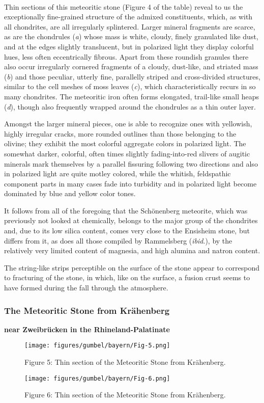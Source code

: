 \documentclass[a4paper, 12pt, oneside]{article}
\begin{document}
\paragraph*{}
Thin sections of this meteoritic stone (Figure 4 of the table) reveal to us the exceptionally fine-grained structure of the admixed constituents, which, as with all chondrites, are all irregularly splintered. Larger mineral fragments are scarce, as are the chondrules (\emph{a}) whose mass is white, cloudy, finely granulated like dust, and at the edges slightly translucent, but in polarized light they display colorful hues, less often eccentrically fibrous. Apart from these roundish granules there also occur irregularly cornered fragments of a cloudy, dust-like, and striated mass (\emph{b}) and those peculiar, utterly fine, parallelly striped and cross-divided structures, similar to the cell meshes of moss leaves (\emph{c}), which characteristically recurs in so many chondrites. The meteoritic iron often forms elongated, trail-like small heaps (\emph{d}), though also frequently wrapped around the chondrules as a thin outer layer.

Amongst the larger mineral pieces, one is able to recognize ones with yellowish, highly irregular cracks, more rounded outlines than those belonging to the olivine; they exhibit the most colorful aggregate colors in polarized light. The somewhat darker, colorful, often times slightly fading-into-red slivers of augitic minerals mark themselves by a parallel fissuring following two directions and also in polarized light are quite motley colored, while the whitish, feldspathic component parts in many cases fade into turbidity and in polarized light become dominated by blue and yellow color tones.

It follows from all of the foregoing that the Schönenberg meteorite, which was previously not looked at chemically, belongs to the major group of the chondrites and, due to its low silica content, comes very close to the Ensisheim stone, but differs from it, as does all those compiled by Rammelsberg (\emph{ibid}.), by the relatively very limited content of magnesia, and high alumina and natron content.

The string-like strips perceptible on the surface of the stone appear to correspond to fracturing of the stone, in which, like on the surface, a fusion crust seems to have formed during the fall through the atmosphere.
\clearpage

\subsubsection{The Meteoritic Stone from Krähenberg}
\textbf{near Zweibrücken in the Rhineland-Palatinate}
\begin{figure}[h]
\centering
\texttt{[image: figures/gumbel/bayern/Fig-5.png]}
\caption{Figure 5: Thin section of the Meteoritic Stone from Krähenberg.}
\end{figure}
\begin{figure}[h]
\centering
\texttt{[image: figures/gumbel/bayern/Fig-6.png]}
\caption{Figure 6: Thin section of the Meteoritic Stone from Krähenberg.}
\end{figure}
\end{document}
